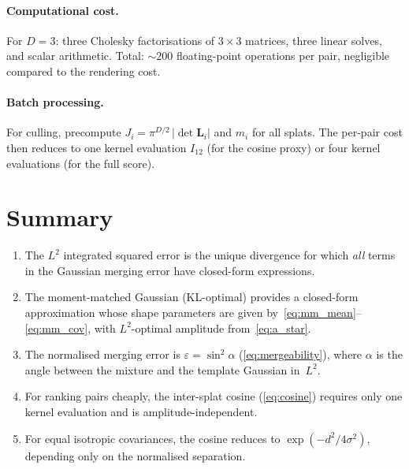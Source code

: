 \documentclass[11pt, a4paper]{article}
\theoremstyle{plain}
\theoremstyle{definition}
\theoremstyle{remark}
\newcommand{\Lchol}{\bm{L}}
\begin{document}
\paragraph{Computational cost.}
For $D = 3$: three Cholesky factorisations of $3\times 3$ matrices,
three linear solves, and scalar arithmetic.  Total: $\sim 200$
floating-point operations per pair, negligible compared to the
rendering cost.

\paragraph{Batch processing.}
For culling, precompute $J_i = \pi^{D/2}\,|\det\Lchol_i|$ and
$m_i$ for all splats.  The per-pair cost then reduces to one
kernel evaluation $I_{12}$ (for the cosine proxy) or four kernel
evaluations (for the full score).


\section{Summary}\label{sec:summary}

\begin{enumerate}
\item The $L^2$ integrated squared error is the unique divergence
  for which \emph{all} terms in the Gaussian merging error have
  closed-form expressions.

\item The moment-matched Gaussian (KL-optimal) provides a
  closed-form approximation whose shape parameters are given
  by~\eqref{eq:mm_mean}--\eqref{eq:mm_cov}, with $L^2$-optimal
  amplitude from~\eqref{eq:a_star}.

\item The normalised merging error is
  $\varepsilon = \sin^2\!\alpha$ (\cref{eq:mergeability}),
  where $\alpha$ is the angle between the mixture and the template
  Gaussian in~$L^2$.

\item For ranking pairs cheaply, the inter-splat cosine
  (\cref{eq:cosine}) requires only one kernel evaluation and is
  amplitude-independent.

\item For equal isotropic covariances, the cosine reduces to
  $\exp(-d^2/4\sigma^2)$, depending only on the normalised
  separation.
\end{enumerate}




\end{document}
